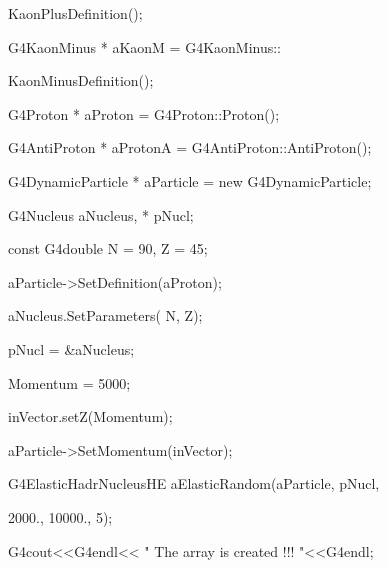 \documentclass[12pt]{article}
\begin{document}
{\hspace{5cm}              KaonPlusDefinition();

\hspace{1cm}    G4KaonMinus       *  aKaonM    = G4KaonMinus::

\hspace{5cm}          KaonMinusDefinition();

\hspace{1cm}   G4Proton          *  aProton   = G4Proton::Proton();

\hspace{1cm} G4AntiProton      *  aProtonA  = G4AntiProton::AntiProton();

\hspace{1cm} G4DynamicParticle *  aParticle = new G4DynamicParticle;


\hspace{1cm} G4Nucleus            aNucleus, * pNucl;

\hspace{1cm}  const G4double N = 90, Z = 45;

\vspace{2ex}
\hspace{2cm}  aParticle->SetDefinition(aProton);

\hspace{2cm}  aNucleus.SetParameters( N, Z);

\hspace{2cm}        pNucl   = \&aNucleus;


\hspace{2cm}       Momentum = 5000;

\hspace{2cm}        inVector.setZ(Momentum);

\hspace{2cm}     aParticle->SetMomentum(inVector);

\hspace{2cm}  G4ElasticHadrNucleusHE    aElasticRandom(aParticle, pNucl,

\hspace{4cm}     2000., 10000., 5);

\hspace{2cm}  G4cout<<G4endl<< " The array is created !!! "<<G4endl;

}
\end{document}
